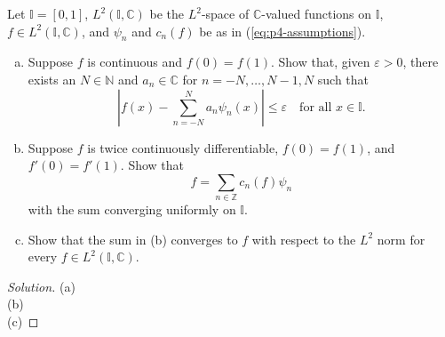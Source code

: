 \documentclass[10pt]{article}
\providecommand{\eps}{\varepsilon}
\providecommand{\CC}{\mathbb C}
\providecommand{\NN}{\mathbb N}
\providecommand{\ZZ}{\mathbb Z}
\providecommand{\ii}{\item}
\newenvironment{soln}{\begin{proof}[Solution]}{\end{proof}}
\providecommand{\abs}[1]{\left\lvert #1\right\rvert}
\begin{document}
\begin{problem}
    Let $\mathbb I = [0,1]$, $L^2(\mathbb I,\CC)$ be
    the $L^2$-space of $\CC$-valued functions on $\mathbb I$,
    $f\in L^2(\mathbb I,\CC)$, and $\psi_n$ and $c_n(f)$ be as in
    (\ref{eq:p4-assumptions}).
    \begin{enumerate}[(a)]
	\ii Suppose $f$ is continuous and $f(0) = f(1)$.
	Show that, given $\eps>0$, there exists an $N\in\NN$
	and $a_n\in\CC$ for $n=-N,\dots,N-1,N$ such that
	\begin{equation*}
	    \abs{f(x) - \sum_{n=-N}^N a_n\psi_n(x)}\le \eps
	    \quad\text{for all }x\in\mathbb I.
	\end{equation*}
	\ii Suppose $f$ is twice continuously differentiable,
	$f(0) = f(1)$, and $f'(0) = f'(1)$. Show that
	\begin{equation*}
	    f = \sum_{n\in\ZZ} c_n(f)\psi_n
	\end{equation*}
	with the sum converging uniformly on $\mathbb I$.
	\ii Show that the sum in (b) converges to $f$
	with respect to the $L^2$ norm for every $f\in L^2(\mathbb I,\CC)$.
\end{enumerate}
\end{problem}

\begin{soln}
    (a) 
    \\

    (b)
    \\

    (c)
\end{soln}
\end{document}
